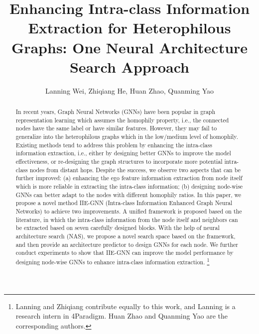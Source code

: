 \documentclass[sigconf]{acmart}
\begin{document}
\title{Enhancing Intra-class Information Extraction for Heterophilous Graphs: One Neural Architecture Search Approach}


\author{Lanning Wei, 
		Zhiqiang He,
	Huan Zhao, 
	Quanming Yao}





\begin{abstract}
	In recent years, Graph Neural Networks (GNNs) have been popular in graph representation learning which assumes the homophily property, i.e., the connected nodes have the same label or have similar features. However, they may fail to generalize into the heterophilous graphs which in the low/medium level of homophily. 
	Existing methods tend to address this problem by enhancing the intra-class information extraction, i.e., either by designing better GNNs to improve the model effectiveness, or re-designing the graph structures to incorporate more potential intra-class nodes from distant hops. 
	Despite the success, we observe two aspects that can be further improved: (a) enhancing the ego feature information extraction from node itself which is more reliable in extracting the intra-class information; (b) designing node-wise GNNs can better adapt to the nodes with different homophily ratios.
	In this paper, we propose a novel method IIE-GNN (Intra-class Information Enhanced Graph Neural Networks) to achieve two improvements. A unified framework is proposed based on the literature, in which the intra-class information from the node itself and neighbors can be extracted based on seven carefully designed blocks. With the help of neural architecture search (NAS), we propose a novel search space based on the framework, and then provide an architecture predictor to design GNNs for each node.
	We further conduct experiments to show that IIE-GNN can improve the model performance by designing node-wise GNNs to enhance intra-class information extraction.
\footnote{Lanning and Zhiqiang contribute equally to this work, and Lanning is a research intern in 4Paradigm. Huan Zhao and Quanming Yao are the corresponding authors. }

\end{abstract}
\end{document}
